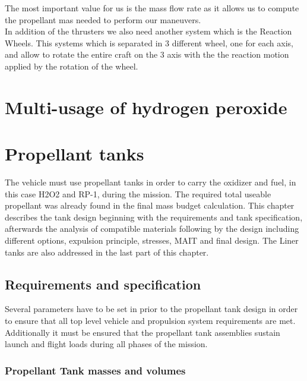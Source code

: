The most important value for us is the mass flow rate as it allows us to compute the propellant mas needed to perform our maneuvers. \\


In addition of the thrusters we also need another system which is the Reaction Wheels. This systems which is separated in 3 different wheel, one for each axis, and allow to rotate the entire craft on the 3 axis with the the reaction motion applied by the rotation of the wheel.

\section{Multi-usage of hydrogen peroxide}
\label{sec:10-3}

\section{Propellant tanks}
The vehicle must use propellant tanks in order to carry the oxidizer and fuel, in this case H2O2 and RP-1, during the mission. The required total useable propellant was already found in the final mass budget calculation. 
This chapter describes the tank design beginning with the requirements and tank specification, afterwards the analysis of compatible materials following by the design including different options, expulsion principle, stresses, MAIT and final design. The Liner tanks are also addressed in the last part of this chapter.\\

\subsection{Requirements and specification}
Several parameters have to be set in prior to the propellant tank design in order to ensure that all top level vehicle and propulsion system requirements are met. Additionally it must be ensured that the propellant tank assemblies sustain launch and flight loads during all phases of the mission.
\subsubsection{Propellant Tank masses and volumes}

